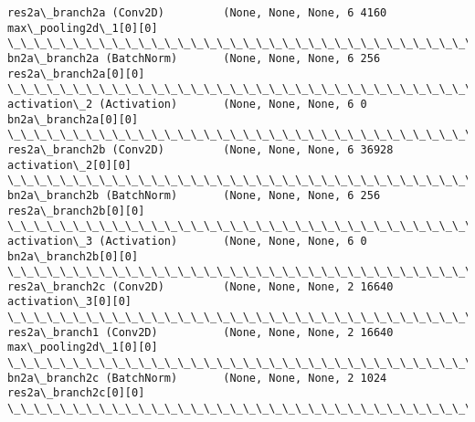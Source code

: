 \documentclass[11pt]{article}
\begin{document}
\begin{Verbatim}[commandchars=\\\{\}]
res2a\_branch2a (Conv2D)         (None, None, None, 6 4160        max\_pooling2d\_1[0][0]            
\_\_\_\_\_\_\_\_\_\_\_\_\_\_\_\_\_\_\_\_\_\_\_\_\_\_\_\_\_\_\_\_\_\_\_\_\_\_\_\_\_\_\_\_\_\_\_\_\_\_\_\_\_\_\_\_\_\_\_\_\_\_\_\_\_\_\_\_\_\_\_\_\_\_\_\_\_\_\_\_\_\_\_\_\_\_\_\_\_\_\_\_\_\_\_\_\_\_
bn2a\_branch2a (BatchNorm)       (None, None, None, 6 256         res2a\_branch2a[0][0]             
\_\_\_\_\_\_\_\_\_\_\_\_\_\_\_\_\_\_\_\_\_\_\_\_\_\_\_\_\_\_\_\_\_\_\_\_\_\_\_\_\_\_\_\_\_\_\_\_\_\_\_\_\_\_\_\_\_\_\_\_\_\_\_\_\_\_\_\_\_\_\_\_\_\_\_\_\_\_\_\_\_\_\_\_\_\_\_\_\_\_\_\_\_\_\_\_\_\_
activation\_2 (Activation)       (None, None, None, 6 0           bn2a\_branch2a[0][0]              
\_\_\_\_\_\_\_\_\_\_\_\_\_\_\_\_\_\_\_\_\_\_\_\_\_\_\_\_\_\_\_\_\_\_\_\_\_\_\_\_\_\_\_\_\_\_\_\_\_\_\_\_\_\_\_\_\_\_\_\_\_\_\_\_\_\_\_\_\_\_\_\_\_\_\_\_\_\_\_\_\_\_\_\_\_\_\_\_\_\_\_\_\_\_\_\_\_\_
res2a\_branch2b (Conv2D)         (None, None, None, 6 36928       activation\_2[0][0]               
\_\_\_\_\_\_\_\_\_\_\_\_\_\_\_\_\_\_\_\_\_\_\_\_\_\_\_\_\_\_\_\_\_\_\_\_\_\_\_\_\_\_\_\_\_\_\_\_\_\_\_\_\_\_\_\_\_\_\_\_\_\_\_\_\_\_\_\_\_\_\_\_\_\_\_\_\_\_\_\_\_\_\_\_\_\_\_\_\_\_\_\_\_\_\_\_\_\_
bn2a\_branch2b (BatchNorm)       (None, None, None, 6 256         res2a\_branch2b[0][0]             
\_\_\_\_\_\_\_\_\_\_\_\_\_\_\_\_\_\_\_\_\_\_\_\_\_\_\_\_\_\_\_\_\_\_\_\_\_\_\_\_\_\_\_\_\_\_\_\_\_\_\_\_\_\_\_\_\_\_\_\_\_\_\_\_\_\_\_\_\_\_\_\_\_\_\_\_\_\_\_\_\_\_\_\_\_\_\_\_\_\_\_\_\_\_\_\_\_\_
activation\_3 (Activation)       (None, None, None, 6 0           bn2a\_branch2b[0][0]              
\_\_\_\_\_\_\_\_\_\_\_\_\_\_\_\_\_\_\_\_\_\_\_\_\_\_\_\_\_\_\_\_\_\_\_\_\_\_\_\_\_\_\_\_\_\_\_\_\_\_\_\_\_\_\_\_\_\_\_\_\_\_\_\_\_\_\_\_\_\_\_\_\_\_\_\_\_\_\_\_\_\_\_\_\_\_\_\_\_\_\_\_\_\_\_\_\_\_
res2a\_branch2c (Conv2D)         (None, None, None, 2 16640       activation\_3[0][0]               
\_\_\_\_\_\_\_\_\_\_\_\_\_\_\_\_\_\_\_\_\_\_\_\_\_\_\_\_\_\_\_\_\_\_\_\_\_\_\_\_\_\_\_\_\_\_\_\_\_\_\_\_\_\_\_\_\_\_\_\_\_\_\_\_\_\_\_\_\_\_\_\_\_\_\_\_\_\_\_\_\_\_\_\_\_\_\_\_\_\_\_\_\_\_\_\_\_\_
res2a\_branch1 (Conv2D)          (None, None, None, 2 16640       max\_pooling2d\_1[0][0]            
\_\_\_\_\_\_\_\_\_\_\_\_\_\_\_\_\_\_\_\_\_\_\_\_\_\_\_\_\_\_\_\_\_\_\_\_\_\_\_\_\_\_\_\_\_\_\_\_\_\_\_\_\_\_\_\_\_\_\_\_\_\_\_\_\_\_\_\_\_\_\_\_\_\_\_\_\_\_\_\_\_\_\_\_\_\_\_\_\_\_\_\_\_\_\_\_\_\_
bn2a\_branch2c (BatchNorm)       (None, None, None, 2 1024        res2a\_branch2c[0][0]             
\_\_\_\_\_\_\_\_\_\_\_\_\_\_\_\_\_\_\_\_\_\_\_\_\_\_\_\_\_\_\_\_\_\_\_\_\_\_\_\_\_\_\_\_\_\_\_\_\_\_\_\_\_\_\_\_\_\_\_\_\_\_\_\_\_\_\_\_\_\_\_\_\_\_\_\_\_\_\_\_\_\_\_\_\_\_\_\_\_\_\_\_\_\_\_\_\_\_

\end{Verbatim}
\end{document}
